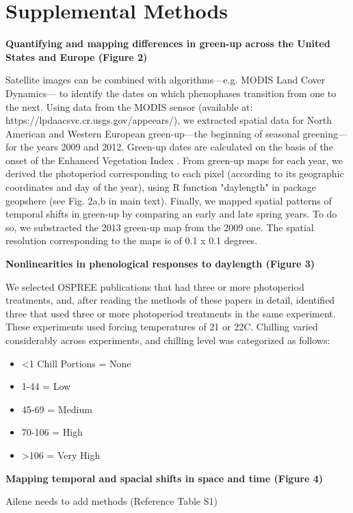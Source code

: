 \documentclass{article}
\begin{document}
\section*{Supplemental Methods}
\par \textbf{Quantifying and mapping differences in green-up across the United States and Europe (Figure 2)}
\par Satellite images can be combined with algorithms---e.g. MODIS Land Cover Dynamics--- to identify the dates on which phenophases transition from one to the next. Using data from the MODIS sensor (available at:  https://lpdaacsvc.cr.usgs.gov/appeears/), we extracted spatial data for North American and Western European green-up---the beginning of seasonal greening---for the years 2009 and 2012. Green-up dates are calculated on the basis of the onset of the Enhanced Vegetation Index \citep{huete2002}. From green-up maps for each year, we derived the photoperiod corresponding to each pixel (according to its geographic coordinates and day of the year), using R function "daylength" in package geopshere (see Fig. 2a,b in main text). Finally, we mapped spatial patterns of temporal shifts in green-up by comparing an early and late spring years. To do so, we substracted the 2013 green-up map from the 2009 one. The spatial resolution corresponding to the maps is of 0.1 x 0.1 degrees.
\par \textbf{Nonlinearities in phenological responses to daylength (Figure 3)}
\par We selected OSPREE publications that had three or more photoperiod treatments, and, after reading the methods of these papers in detail, identified three that used three or more photoperiod treatments in the same experiment\citep{Ashby:1962aa,Heide:1993a,Caffarra:2011b}. These experiments used forcing temperatures of 21 or 22\degree C. Chilling varied considerably across experiments, and chilling level was categorized as follows:
\begin{itemize}
\item <1 Chill Portions = None
\item 1-44 = Low
\item 45-69 = Medium 
\item 70-106 = High
\item >106 = Very High
\end{itemize}


\par \textbf{Mapping temporal and spacial shifts in space and time  (Figure 4)}
\par Ailene needs to add methods (Reference Table S1)
\end{document}
